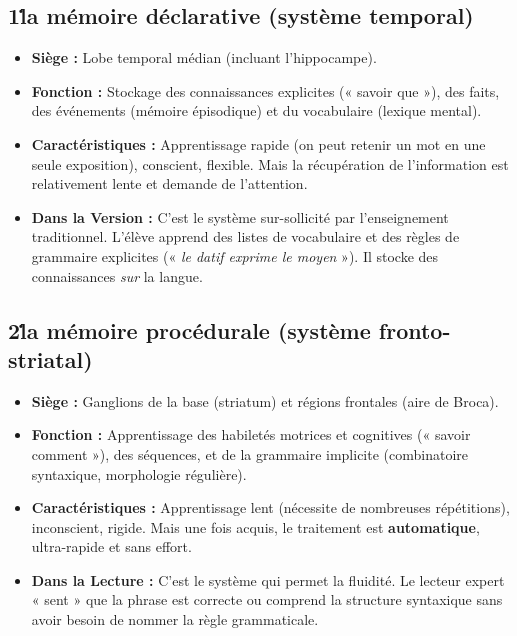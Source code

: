 \subsection{1\. la mémoire déclarative (système temporal)}

\begin{itemize}\item \textbf{Siège :} Lobe temporal médian (incluant l'hippocampe).\item \textbf{Fonction :} Stockage des connaissances explicites (« savoir que »), des faits, des événements (mémoire épisodique) et du vocabulaire (lexique mental).\item \textbf{Caractéristiques :} Apprentissage rapide (on peut retenir un mot en une seule exposition), conscient, flexible. Mais la récupération de l'information est relativement lente et demande de l'attention.\cite{II-3-1-ref42}\item \textbf{Dans la Version :} C'est le système sur-sollicité par l'enseignement traditionnel. L'élève apprend des listes de vocabulaire et des règles de grammaire explicites (« \textit{le datif exprime le moyen} »). Il stocke des connaissances \textit{sur} la langue.\end{itemize}

\subsection{2\. la mémoire procédurale (système fronto-striatal)}

\begin{itemize}\item \textbf{Siège :} Ganglions de la base (striatum) et régions frontales (aire de Broca).\item \textbf{Fonction :} Apprentissage des habiletés motrices et cognitives (« savoir comment »), des séquences, et de la grammaire implicite (combinatoire syntaxique, morphologie régulière).\item \textbf{Caractéristiques :} Apprentissage lent (nécessite de nombreuses répétitions), inconscient, rigide. Mais une fois acquis, le traitement est \textbf{automatique}, ultra-rapide et sans effort.\cite{II-3-1-ref43}\item \textbf{Dans la Lecture :} C'est le système qui permet la fluidité. Le lecteur expert « sent » que la phrase est correcte ou comprend la structure syntaxique sans avoir besoin de nommer la règle grammaticale.\end{itemize}

